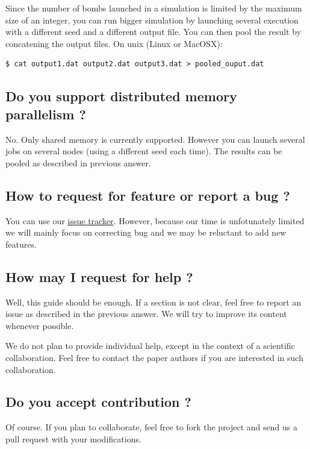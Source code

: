 \documentclass[10pt,a4paper]{article}
\begin{document}
Since the number of bombs launched in a simulation is limited by the maximum
size of an integer, you can run bigger simulation by launching several
execution with a different seed and a different output file. You can then 
pool the result by concatening the output files. On unix (Linux or MacOSX):

\begin{verbatim}
$ cat output1.dat output2.dat output3.dat > pooled_ouput.dat
\end{verbatim}

\subsection{Do you support distributed memory parallelism ?}
\label{sec-6-6}

No. Only shared memory is currently supported. However you can launch 
several jobs on several nodes (using a different seed each time). The results
can be pooled as described in previous answer.

\subsection{How to request for feature or report a bug ?}
\label{sec-6-7}

You can use our \href{http://www.example.com/bugs}{issue tracker}. However, because our time is unfotunately limited
we will mainly focus on correcting bug and we may be reluctant to add new features.

\subsection{How may I request for help ?}
\label{sec-6-8}

Well, this guide should be enough. If a section is not clear, feel free to
report an issue as described in the previous answer. We will try to
improve its content whenever possible.

We do not plan to provide individual help, except in the context of a
scientific collaboration. Feel free to contact the paper authors if
you are interested in such collaboration.

\subsection{Do you accept contribution ?}
\label{sec-6-9}

Of course. If you plan to collaborate, feel free to fork the project
and send us a pull request with your modifications.
\end{document}
